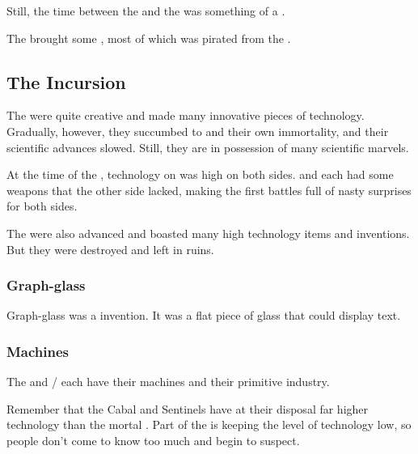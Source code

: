 Still, the time between the \firstbanewar{} and the \secondbanewar{} was something of a . 

The \banes{} brought some , most of which was pirated from the \voyagers{}.









\subsection{The Incursion}
The \resphain{} were quite creative and made many innovative pieces of technology. Gradually, however, they succumbed to  and their own immortality, and their scientific advances slowed. Still, they are in possession of many scientific marvels. 

At the time of the \secondbanewar, technology on \Miith was high on both sides. 
\Miithians and \resphain each had some weapons that the other side lacked, making the first battles full of nasty surprises for both sides. 

The  were also advanced and boasted many high technology items and inventions. 
But they were destroyed and left in ruins. 





\subsubsection{Graph-glass}
Graph-glass was a \resphan{} invention. 
It was a flat piece of glass that could display text. 





\subsubsection{Machines}
The \dragons{} and \banes/\resphain{} each have their machines and their primitive industry. 

Remember that the Cabal and Sentinels have at their disposal far higher technology than the mortal \Miithians. 
Part of the \charade{} is keeping the level of technology low, so people don't come to know too much and begin to suspect.

